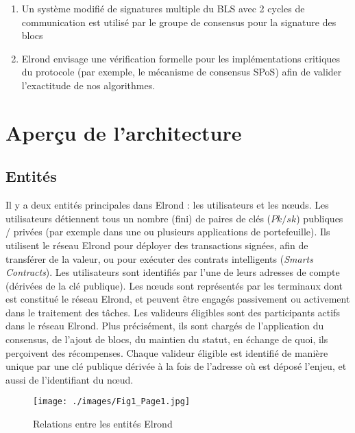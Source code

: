 \documentclass[journal]{IEEEtran}
\begin{document}
\begin{enumerate}
  \item  Un système modifié de signatures multiple du BLS \cite{5} avec 2 cycles de communication est utilisé par le groupe de consensus pour la signature des blocs
  \item Elrond envisage une vérification formelle pour les implémentations critiques du protocole (par exemple, le mécanisme de consensus SPoS) afin de valider l’exactitude de nos algorithmes. 
\end{enumerate}


\section{Aperçu de l'architecture}\label{Archi}

\subsection{Entités} 
\label{Archi1}
Il y a deux entités principales dans Elrond : les utilisateurs et les nœuds. Les utilisateurs détiennent tous un nombre (fini) de paires de clés ($Pk/sk$) publiques / privées (par exemple dans une ou plusieurs applications de portefeuille). Ils utilisent le réseau Elrond pour déployer des transactions signées, afin de transférer de la valeur, ou pour exécuter des contrats intelligents (\textit{Smarts Contracts}). Les utilisateurs sont identifiés par l'une de leurs adresses de compte (dérivées de la clé publique). Les nœuds sont représentés par les terminaux dont est constitué le réseau Elrond, et peuvent être engagés passivement ou activement dans le traitement des tâches. Les valideurs éligibles sont des participants actifs dans le réseau Elrond. Plus précisément, ils sont chargés de l’application du consensus, de l'ajout de blocs, du maintien du statut, en échange de quoi, ils perçoivent des récompenses. Chaque valideur éligible est identifié de manière unique par une clé publique dérivée à la fois de l'adresse où est déposé l’enjeu, et aussi de l'identifiant du nœud.

\begin{figure}
	\texttt{[image: ./images/Fig1\_Page1.jpg]} %
	\caption{Relations entre les entités Elrond} %
	\label{Fig.1} %
\end{figure}
\end{document}
